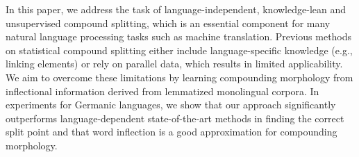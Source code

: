 In this paper, we address the task of language-independent, knowledge-lean and unsupervised compound splitting, which is an essential component for many natural language processing tasks such as machine translation. Previous methods on statistical compound splitting either include language-specific knowledge (e.g., linking elements) or rely on parallel data, which results in limited applicability. We aim to overcome these limitations by learning compounding morphology from inflectional information derived from lemmatized monolingual corpora. In experiments for Germanic languages, we show that our approach significantly outperforms language-dependent state-of-the-art methods in finding the correct split point and that word inflection is a good approximation for compounding morphology.
